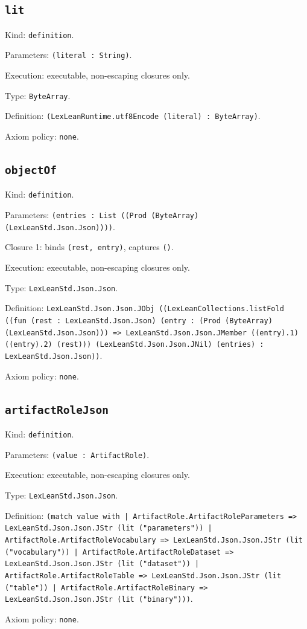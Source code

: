 \documentclass[11pt]{article}
\begin{document}
\subsection*{\texttt{lit}}
\noindent Kind: \texttt{definition}.\par
\noindent Parameters: \texttt{(literal : String)}.\par
\noindent Execution: executable, non-escaping closures only.\par
\noindent Type: \texttt{ByteArray}.\par
\noindent Definition: \texttt{(LexLeanRuntime.utf8Encode (literal) : ByteArray)}.\par
\noindent Axiom policy: \texttt{none}.\par
\subsection*{\texttt{objectOf}}
\noindent Kind: \texttt{definition}.\par
\noindent Parameters: \texttt{(entries : List ((Prod (ByteArray) (LexLeanStd.Json.Json))))}.\par
\noindent Closure 1: binds \texttt{(rest, entry)}, captures \texttt{()}.\par
\noindent Execution: executable, non-escaping closures only.\par
\noindent Type: \texttt{LexLeanStd.Json.Json}.\par
\noindent Definition: \texttt{LexLeanStd.Json.Json.JObj ((LexLeanCollections.listFold ((fun (rest : LexLeanStd.Json.Json) (entry : (Prod (ByteArray) (LexLeanStd.Json.Json))) => LexLeanStd.Json.Json.JMember ((entry).1) ((entry).2) (rest))) (LexLeanStd.Json.Json.JNil) (entries) : LexLeanStd.Json.Json))}.\par
\noindent Axiom policy: \texttt{none}.\par
\subsection*{\texttt{artifactRoleJson}}
\noindent Kind: \texttt{definition}.\par
\noindent Parameters: \texttt{(value : ArtifactRole)}.\par
\noindent Execution: executable, non-escaping closures only.\par
\noindent Type: \texttt{LexLeanStd.Json.Json}.\par
\noindent Definition: \texttt{(match value with | ArtifactRole.ArtifactRoleParameters => LexLeanStd.Json.Json.JStr (lit ("parameters")) | ArtifactRole.ArtifactRoleVocabulary => LexLeanStd.Json.Json.JStr (lit ("vocabulary")) | ArtifactRole.ArtifactRoleDataset => LexLeanStd.Json.Json.JStr (lit ("dataset")) | ArtifactRole.ArtifactRoleTable => LexLeanStd.Json.Json.JStr (lit ("table")) | ArtifactRole.ArtifactRoleBinary => LexLeanStd.Json.Json.JStr (lit ("binary")))}.\par
\noindent Axiom policy: \texttt{none}.\par
\end{document}
